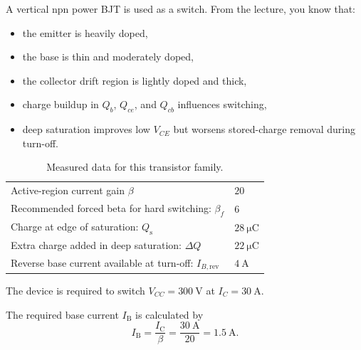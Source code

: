 

A vertical npn power BJT is used as a switch. From the lecture, you know that:
\begin{itemize}
    \setlength{\itemsep}{-2pt} %
    \setlength{\parskip}{-2pt} %
    \item the emitter is heavily doped,
    \item the base is thin and moderately doped,
    \item the collector drift region is lightly doped and thick,
    \item charge buildup in $Q_b$, $Q_{ce}$, and $Q_{cb}$ influences switching,
    \item deep saturation improves low $V_{CE}$ but worsens stored-charge removal during turn-off.
\end{itemize}

\begin{table}[ht]
    \centering  %
    \begin{tabular}{ll}
        \toprule
        Active-region current gain $\beta$                &  $20$ \\ 
        Recommended forced beta for hard switching: $\beta_f$   &  $6$ \\ 
        Charge at edge of saturation: $Q_\mathrm{s}$      &  $\SI{28}{\micro\coulomb}$ \\ 
        Extra charge added in deep saturation: $\Delta Q$ &  $\SI{22}{\micro\coulomb}$ \\
        Reverse base current available at turn-off: $I_{B,\mathrm{rev}}$  & $\SI{4}{\ampere}$ \\
        \bottomrule
    \end{tabular}
    \caption{Measured data for this transistor family.}
    \label{table:ex02_PowerBJTdata}
\end{table}

The device is required to switch $V_{CC} = 300\SI{}{\volt}$ at $I_C = \SI{30}{\ampere}$.


\begin{solutionblock}
    The required base current $I_\mathrm{B}$ is calculated by
    \begin{equation*}
        I_\mathrm{B} = \frac{I_\mathrm{C}}{\beta} = \frac{\SI{30}{\ampere}}{20} = \SI{1.5}{\ampere}.
    \end{equation*}
\end{solutionblock} 

